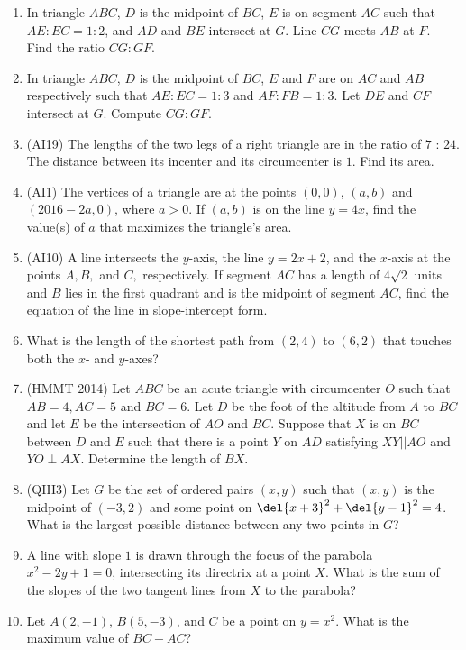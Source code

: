 \documentclass[10pt,paper=letter]{scrartcl}
\begin{document}
\begin{enumerate}
  \item In triangle $ABC$, $D$ is the midpoint of $BC$, $E$ is on segment $AC$ such that $AE : EC = 1 : 2$, and $AD$ and $BE$ intersect at $G$. Line $CG$ meets $AB$ at $F$. Find the ratio $CG : GF$.
  \item In triangle $ABC$, $D$ is the midpoint of $BC$, $E$ and $F$ are on $AC$ and $AB$ respectively such that $AE : EC = 1 : 3$ and $AF : FB = 1 : 3$. Let $DE$ and $CF$ intersect at $G$. Compute $CG : GF$.
  \item (AI19) The lengths of the two legs of a right triangle are in the ratio of $7$ : $24$. The distance between its incenter and its circumcenter is $1$. Find its area.
  \item (AI1) The vertices of a triangle are at the points $(0, 0)$, $(a, b)$ and $(2016 - 2a, 0)$, where $a > 0$. If $(a, b)$ is on the line $y = 4x$, find the value(s) of $a$ that maximizes the triangle's area.
  \item (AI10) A line intersects the $y$-axis, the line $y = 2x + 2$, and the $x$-axis at the points $A, B,$ and $C,$ respectively. If segment $AC$ has a length of $4\sqrt{2}$ units and $B$ lies in the first quadrant and is the midpoint of segment $AC$, find the equation of the line in slope-intercept form.
  \item What is the length of the shortest path from $(2, 4)$ to $(6, 2)$ that touches both the $x$- and $y$-axes?
  \item (HMMT 2014) Let $ABC$ be an acute triangle with circumcenter $O$ such that $AB = 4, AC = 5$ and $BC = 6$. Let $D$ be the foot of the altitude from $A$ to $BC$ and let $E$ be the intersection of $AO$ and $BC$. Suppose that $X$ is on $BC$ between $D$ and $E$ such that there is a point $Y$ on $AD$ satisfying $XY || AO$ and $YO \perp AX$. Determine the length of $BX$.
  \item (QIII3) Let $G$ be the set of ordered pairs $(x, y)$ such that $(x, y)$ is the midpoint of $(-3, 2)$ and some point on $\del{x+3}^2 + \del{y-1}^2 = 4$. What is the largest possible distance between any two points in $G$?
  \item A line with slope $1$ is drawn through the focus of the parabola $x^2 - 2y + 1 = 0$, intersecting its directrix at a point $X$. What is the sum of the slopes of the two tangent lines from $X$ to the parabola?
  \item Let $A(2, -1)$, $B(5, -3)$, and $C$ be a point on $y = x^2$. What is the maximum value of $BC - AC$?
\end{enumerate}
\end{document}
